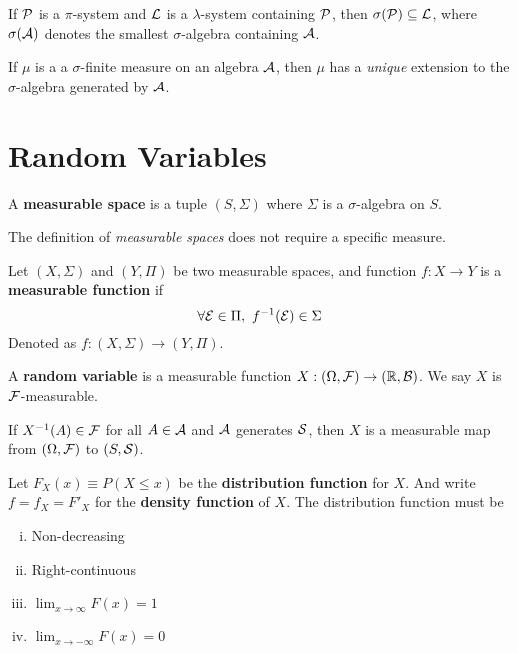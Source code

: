 \documentclass[11pt]{article}
\begin{document}
		\begin{theorem}
			If $\mathcal{{P}}$ is a $\pi$-system and $\mathcal{{L}}$ is a $\lambda$-system containing $\mathcal{{P}}$, then $\sigma(\mathcal{{P}}) \subseteq \mathcal{{L}}$, where $\sigma(\mathcal{{A}})$ denotes the smallest $\sigma$-algebra containing $\mathcal{{A}}$.
		\end{theorem}
		
		\begin{theorem}
			If $\mu$ is a a $\sigma$-finite measure on an algebra $\mathcal{{A}}$, then $\mu$ has a \emph{unique} extension to the $\sigma$-algebra generated by $\mathcal{{A}}$.
		\end{theorem}
	
	\section{Random Variables}
		\begin{definition}
			A \textbf{measurable space} is a tuple $(S, \Sigma)$ where $\Sigma$ is a $\sigma$-algebra on $S$.
		\end{definition}
		
		\begin{remark}
			The definition of \emph{measurable spaces} does not require a specific measure.
		\end{remark}
		
		\begin{definition}
			Let $(X, \Sigma)$ and $(Y, \Pi)$ be two measurable spaces, and function $f: X \to Y$ is a \textbf{measurable function} if 
			\[
				\forall \mathcal{{E}} \in \Pi,\ f^{-1}(\mathcal{{E}}) \in \Sigma
			\]
			Denoted as $f: (X, \Sigma) \to (Y, \Pi)$.
		\end{definition}
		
		\begin{definition}
			A \textbf{random variable} is a measurable function $X: (\Omega, \mathcal{{F}}) \to (\mathbb{R}, \mathcal{{B}})$. We say $X$ is $\mathcal{{F}}$-measurable.
		\end{definition}
		
		\begin{theorem}
			If $X^{-1}(A) \in \mathcal{{F}}$ for all $A \in \mathcal{{A}}$ and $\mathcal{{A}}$ generates $\mathcal{{S}}$, then $X$ is a measurable map from $(\Omega, \mathcal{{F}})$ to $(S, \mathcal{{S}})$.
		\end{theorem}
		
		\begin{definition}
			Let $F_X(x) \equiv P(X \leq x)$ be the \textbf{distribution function} for $X$. And write $f = f_X = F'_X$ for the \textbf{density function} of $X$. The distribution function must be
			\begin{enumerate}[(i)]
				\item Non-decreasing
				\item Right-continuous
				\item $\lim_{x\to \infty} F(x) = 1$
				\item $\lim_{x \to - \infty} F(x) = 0$
			\end{enumerate}
		\end{definition}
\end{document}
